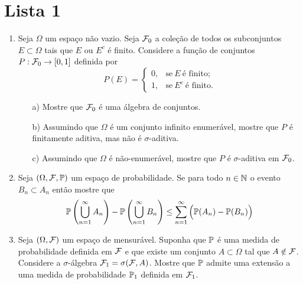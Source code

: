 \chapter*{Lista 1}
\chaptermark{}

\begin{enumerate}[leftmargin=*]


\item 
Seja $\Omega$ um espaço não vazio. 
Seja $\F_0$ a coleção de todos os 
subconjuntos $E\subset\Omega$ 
tais que $E$ ou $E^c$ é finito.
Considere a função de conjuntos $P:\F_0\to [0,1]$
definida por 
	\[
		P(E) =
		\begin{cases}
		0,&\text{se}\ E \ \text{é finito};
		\\
		1,&\text{se}\ E^c \ \text{é finito}.
		\end{cases}
	\]
	\begin{itemize}
		\item[a)]
		Mostre que $\F_0$ é uma álgebra de conjuntos.
		
		\item[b)] 
		Assumindo que $\Omega$ é um conjunto infinito enumerável,
		mostre que $P$ é finitamente aditiva, mas não é $\sigma$-aditiva.
		
		\item[c)]
		Assumindo que $\Omega$ é não-enumerável, mostre que $P$ 
		é $\sigma$-aditiva em $\F_0$.
		
	\end{itemize}





\item 
Seja $(\Omega,\F,\P)$ um espaço de probabilidade.
Se para todo $n\in\N$ o evento 
$B_n\subset A_n$ então mostre que 
	\[
		\P\left( \bigcup_{n=1}^{\infty} A_n \right)
		-\P\left( \bigcup_{n=1}^{\infty} B_n  \right)	
		\leq 
		\sum_{n=1}^{\infty} \Big( \P(A_n)-\P(B_n) \Big)	
	\]





\item 
Seja $(\Omega,\F)$ um espaço de mensurável. 
Suponha que $\P$ é uma medida de probabilidade
definida em $\F$ e que existe um conjunto $A\subset\Omega$
tal que $A\notin\F$. Considere a $\sigma$-álgebra 
$\F_1 = \sigma(\F,A)$. Mostre que $\P$ admite uma extensão 
a uma medida de probabilidade $\P_1$ definida em $\F_1$. 






\end{enumerate}
